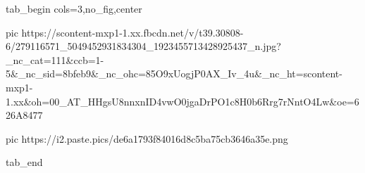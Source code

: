  
 
 
 
 


\ifcmt
  tab_begin cols=3,no_fig,center

     pic https://scontent-mxp1-1.xx.fbcdn.net/v/t39.30808-6/279116571_5049452931834304_1923455713428925437_n.jpg?_nc_cat=111&ccb=1-5&_nc_sid=8bfeb9&_nc_ohc=85O9xUogjP0AX_Iv_4u&_nc_ht=scontent-mxp1-1.xx&oh=00_AT_HHgsU8nnxnID4vwO0jgaDrPO1c8H0b6Rrg7rNntO4Lw&oe=626A8477

		 pic https://i2.paste.pics/de6a1793f84016d8c5ba75cb3646a35e.png

  tab_end
\fi
